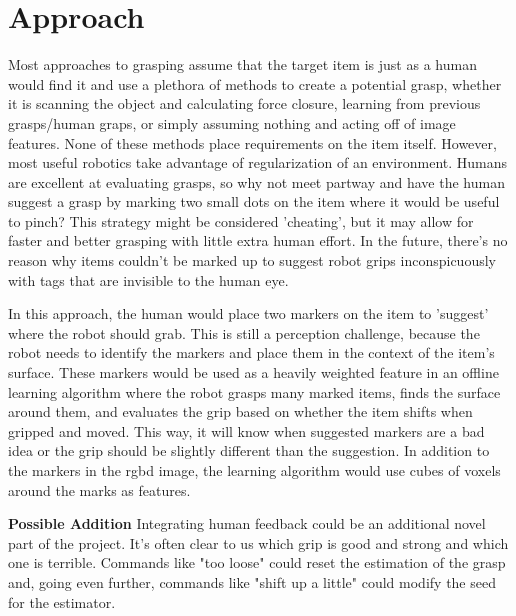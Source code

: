 \documentclass[10pt]{article}
\begin{document}
\section{Approach} \label{sec:approach}
Most approaches to grasping assume that the target item is just as a human would find it and use a plethora of methods to create a potential grasp, whether it is scanning the object and calculating force closure, learning from previous grasps/human graps, or simply assuming nothing and acting off of image features. None of these methods place requirements on the item itself. However, most useful robotics take advantage of regularization of an environment. Humans are excellent at evaluating grasps, so why not meet partway and have the human suggest a grasp by marking two small dots on the item where it would be useful to pinch? This strategy might be considered 'cheating', but it may allow for faster and better grasping with little extra human effort. In the future, there's no reason why items couldn't be marked up to suggest robot grips inconspicuously with tags that are invisible to the human eye. 

 In this approach, the human would place two markers on the item to 'suggest' where the robot should grab. This is still a perception challenge, because the robot needs to identify the markers and place them in the context of the item's surface. These markers would be used as a heavily weighted feature in an offline learning algorithm where the robot grasps many marked items, finds the surface around them, and evaluates the grip based on whether the item shifts when gripped and moved. This way, it will know when suggested markers are a bad idea or the grip should be slightly different than the suggestion. In addition to the markers in the rgbd image, the learning algorithm would use cubes of voxels around the marks as features.
 
 \textbf{Possible Addition} Integrating human feedback could be an additional novel part of the project. It's often clear to us which grip is good and strong and which one is terrible. Commands like "too loose" could reset the estimation of the grasp and, going even further, commands like "shift up a little" could modify the seed for the estimator.
 
\end{document}
